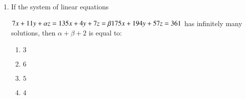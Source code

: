 \documentclass[journal,9pt,onecolumn]{IEEEtran}
\begin{document}
\begin{enumerate}
\item If the system of linear equations 

$7x + 11y + \alpha z = 13\\5x + 4y + 7z = \beta \\175x + 194y + 57z = 361$ has infinitely many solutions, then $\alpha + \beta + 2$ is equal to:
\begin{multicols}{4}
\begin{enumerate}
    \item $3$ 
    \item $6$ 
    \item $5$ 
    \item $4$ 
\end{enumerate}
\end{multicols}

\end{enumerate}
\end{document}
